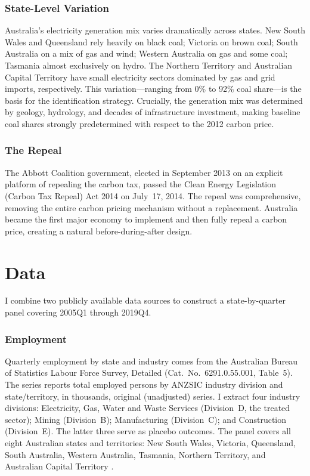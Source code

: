 \documentclass[12pt]{article}
\begin{document}
\subsubsection*{State-Level Variation} Australia's electricity generation mix varies dramatically across states. New South Wales and Queensland rely heavily on black coal; Victoria on brown coal; South Australia on a mix of gas and wind; Western Australia on gas and some coal; Tasmania almost exclusively on hydro. The Northern Territory and Australian Capital Territory have small electricity sectors dominated by gas and grid imports, respectively. This variation---ranging from 0\% to 92\% coal share---is the basis for the identification strategy. Crucially, the generation mix was determined by geology, hydrology, and decades of infrastructure investment, making baseline coal shares strongly predetermined with respect to the 2012 carbon price.

\subsubsection*{The Repeal} The Abbott Coalition government, elected in September 2013 on an explicit platform of repealing the carbon tax, passed the Clean Energy Legislation (Carbon Tax Repeal) Act 2014 on July~17, 2014. The repeal was comprehensive, removing the entire carbon pricing mechanism without a replacement. Australia became the first major economy to implement and then fully repeal a carbon price, creating a natural before-during-after design.


\section{Data}

I combine two publicly available data sources to construct a state-by-quarter panel covering 2005Q1 through 2019Q4.

\subsubsection*{Employment} Quarterly employment by state and industry comes from the Australian Bureau of Statistics Labour Force Survey, Detailed (Cat.\ No.\ 6291.0.55.001, Table~5). The series reports total employed persons by ANZSIC industry division and state/territory, in thousands, original (unadjusted) series. I extract four industry divisions: Electricity, Gas, Water and Waste Services (Division~D, the treated sector); Mining (Division~B); Manufacturing (Division~C); and Construction (Division~E). The latter three serve as placebo outcomes. The panel covers all eight Australian states and territories: New South Wales, Victoria, Queensland, South Australia, Western Australia, Tasmania, Northern Territory, and Australian Capital Territory \citep{abs2024labour}.
\end{document}
